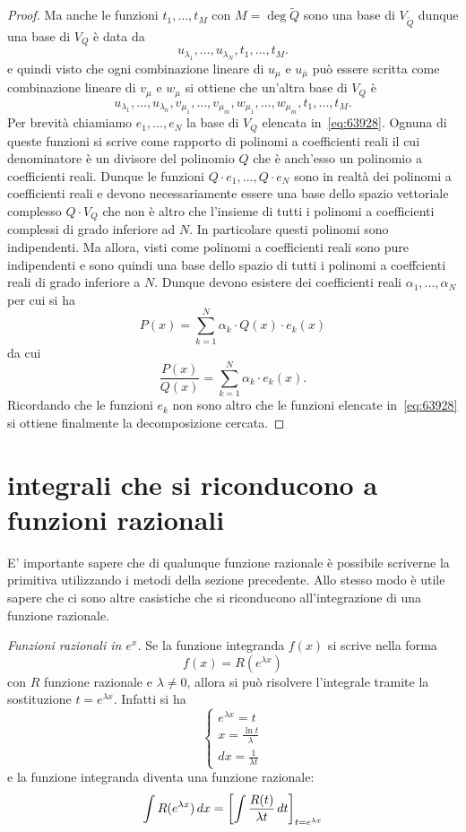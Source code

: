 \begin{proof}
Ma anche le funzioni $t_1, \dots, t_M$ con $M=\deg \tilde Q$
sono una base di $V_{\tilde Q}$ dunque una base
di $V_Q$ è data da
\[
  u_{\lambda_1}, \dots, u_{\lambda_N},
  t_1, \dots, t_M.
\]
e quindi visto che ogni combinazione lineare
di $u_{\mu}$ e $u_{\bar \mu}$ può essere scritta
come combinazione lineare di $v_\mu$ e $w_\mu$
si ottiene che un'altra base di $V_Q$ è
\begin{equation}\label{eq:63928}
  u_{\lambda_1}, \dots, u_{\lambda_n},
  v_{\mu_1}, \dots, v_{\mu_m},
  w_{\mu_1}, \dots, w_{\mu_m},
  t_1, \dots, t_M.
\end{equation}
Per brevità chiamiamo $e_1, \dots, e_N$
la base di $V_Q$ elencata in~\eqref{eq:63928}.
Ognuna di queste funzioni si scrive come
rapporto di polinomi a coefficienti reali
il cui denominatore è un divisore del polinomio $Q$
che è anch'esso un polinomio a coefficienti reali.
Dunque le funzioni $Q\cdot e_1, \dots, Q\cdot e_N$
sono in realtà dei polinomi a coefficienti reali
e devono necessariamente essere una base dello spazio
vettoriale complesso $Q\cdot V_Q$ che non è altro che l'insieme
di tutti i polinomi a coefficienti complessi
di grado inferiore ad $N$. In particolare questi polinomi
sono indipendenti.
Ma allora, visti come polinomi a
coefficienti reali sono pure indipendenti e sono quindi
una base dello spazio di tutti i polinomi a coeffcienti reali
di grado inferiore a $N$.
Dunque devono esistere dei coefficienti reali $\alpha_1, \dots, \alpha_N$
per cui si ha
\[
  P(x) = \sum_{k=1}^N \alpha_k\cdot Q(x)\cdot e_k(x)
\]
da cui
\[
  \frac{P(x)}{Q(x)} = \sum_{k=1}^N \alpha_k \cdot e_k(x).
\]
Ricordando che le funzioni $e_k$ non sono altro che le funzioni
elencate in~\eqref{eq:63928} si ottiene finalmente la decomposizione
cercata.
\end{proof}

\section{integrali che si riconducono a funzioni razionali}

E' importante sapere che di qualunque funzione razionale è possibile
scriverne la primitiva utilizzando i metodi della sezione precedente.
Allo stesso modo è utile sapere che ci sono altre casistiche che si
riconducono all'integrazione di una funzione razionale.

\emph{Funzioni razionali in $e^x$.}
Se la funzione integranda $f(x)$ si scrive nella forma
\[
  f(x) = R(e^{\lambda x})
\]
con $R$ funzione razionale e $\lambda\neq 0$,
allora si può risolvere l'integrale tramite la
sostituzione $t = e^{\lambda x}$. Infatti si ha
\[
\begin{cases}
 e^{\lambda x} = t\\
 x = \frac{\ln t}{\lambda}\\
 dx = \frac{1}{\lambda t}
 \end{cases}
\]
e la funzione integranda diventa una funzione razionale:
\[
 \int R(e^{\lambda x})\, dx = {\left[ \int \frac{R(t)}{\lambda t}\, dt \right]}_{t=e^{\lambda x}}
\]

